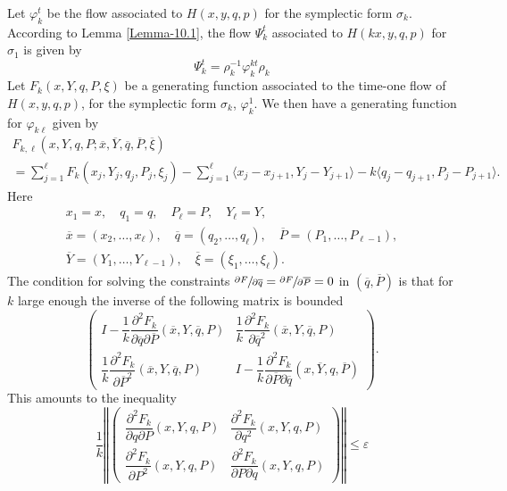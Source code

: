 \documentclass[JEP,XML,SOM,NoFloatCountersInSection,Unicode,published]{cedram}
\numberwithin{equation}{section}
\let \F F
\let \phi \varphi
\theoremstyle{plain}
\theoremstyle{definition}
\theoremstyle{remark}
\begin{document}
Let $\varphi_{k}^{t}$ be the flow associated to $H(x,y,q,p)$ for the symplectic form $\sigma_{k}$. According to Lemma \ref{Lemma-10.1}, the flow $\Psi_{k}^{t}$ associated to $H(kx,y,q,p)$ for~$\sigma_{1}$ is given by
\[
\Psi_{k}^{t}=\rho_k^{-1}\phi_k^{kt}\rho_k
\]
Let $F_{k}(x,Y,q,P,\xi)$ be a generating function associated to the time-one flow of $H(x,y,q,p)$, for the symplectic form $\sigma_{k}$, \ie $\varphi_k^1$. We then have a generating function for $\varphi_{k\ell}$ given by
\begin{multline*}
\F_{k,\ell}(x,Y,q,P;\overline x, \overline Y, \overline q, \overline P, \overline \xi)\\
= \sum_{j=1}^{\ell}F_{k}(x_{j},Y_{j},q_{j},P_{j},\xi_{j}) -\sum_{j=1}^{\ell} \langle x_{j}-x_{j+1}, Y_{j}-Y_{j+1}\rangle - k \langle q_{j}-q_{j+1}, P_{j}-P_{j+1}\rangle.
\end{multline*}
Here
\begin{gather*}
x_{1}=x,\quad q_{1}=q,\quad P_{\ell}=P,\quad Y_{\ell}=Y,\\
\overline x= (x_{2},\dots,x_{\ell}),\quad \overline q= (q_{2},\dots,q_{\ell}),\quad \overline P= (P_{1},\dots,P_{\ell -1}),\\
\overline Y= (Y_{1},\dots,Y_{\ell -1}),\quad \overline \xi =(\xi_1,\dots, \xi_\ell).
\end{gather*}
The condition for solving the constraints $\sfrac{\partial F}{\partial {\overline q}} = \sfrac{\partial F}{\partial {\overline P}}=0$ in $(\overline q, \overline P)$ is that for $k$ large enough the inverse of the following matrix is bounded
\[
\begin{pmatrix}
I- \dfrac{1}{k} \dfrac{\partial^2 \F_{k}}{\partial \overline q\partial \overline P}(\overline x,Y,\overline q,P) & \dfrac{1}{k} \dfrac{\partial^2 \F_{k}}{\partial \overline q^2}(\overline x,Y,\overline q,P) \\[8pt]
\dfrac{1}{k} \dfrac{\partial^2 \F_{k}}{\partial \overline P^{2}}(\overline x,Y,\overline q,P) & I- \dfrac{1}{k} \dfrac{\partial^{2}\F_{k}}{\partial \overline P\partial \overline q}(x,\overline Y,q,\overline P)
\end{pmatrix}.
\]
This amounts to the inequality
\[
\tag{$\star$} \dfrac{1}{k} \left\Vert \begin{pmatrix}
\dfrac{\partial^2 F_k}{\partial q\partial P}(x,Y,q,P) & \dfrac{\partial^2 F_k}{\partial q^2}(x,Y,q,P) \\[8pt]
\dfrac{\partial^2 F_k}{\partial P^{2}} (x,Y,q,P) & \dfrac{\partial^{2}F_k}{\partial P\partial q}(x,Y,q,P)
\end{pmatrix}\right \Vert \leq \varepsilon
\]
\end{document}
